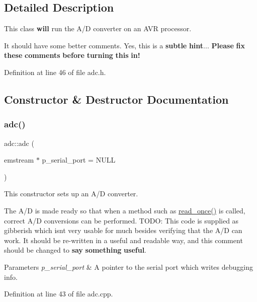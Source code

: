 \subsection{Detailed Description}
This class {\bfseries will} run the A/D converter on an A\+VR processor. 

It should have some better comments. Yes, this is a {\bfseries subtle} {\bfseries hint}... {\bfseries Please} {\bfseries fix} {\bfseries these} {\bfseries comments} {\bfseries before} {\bfseries turning} {\bfseries this} {\bfseries in!} 

Definition at line 46 of file adc.\+h.



\subsection{Constructor \& Destructor Documentation}
\mbox{\label{classadc_af3b8262c08f5fc5ae325a20622883424}} 
\subsubsection{\texorpdfstring{adc()}{adc()}}
{\footnotesize\ttfamily adc\+::adc (\begin{DoxyParamCaption}\item[{emstream $\ast$}]{p\+\_\+serial\+\_\+port = {\ttfamily NULL} }\end{DoxyParamCaption})}



This constructor sets up an A/D converter. 

The A/D is made ready so that when a method such as {\ttfamily \mbox{\hyperlink{classadc_a2190a59696a7093e1ea605e998ccf97e}{read\+\_\+once()}}} is called, correct A/D conversions can be performed. T\+O\+DO\+: This code is supplied as gibberish which isn\textquotesingle{}t very usable for much besides verifying that the A/D can work. It should be re-\/written in a useful and readable way, and this comment should be changed to {\bfseries say} {\bfseries something} {\bfseries useful}. 
\begin{DoxyParams}{Parameters}
{\em p\+\_\+serial\+\_\+port} & A pointer to the serial port which writes debugging info. \\
\hline
\end{DoxyParams}


Definition at line 43 of file adc.\+cpp.



